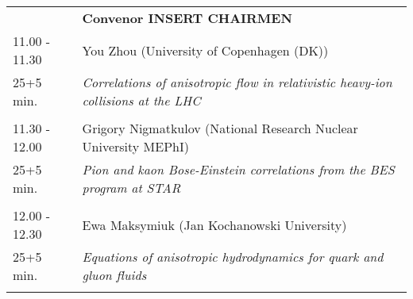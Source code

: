 \begin{longtable}{p{3cm}p{13cm}}
&\hfill {\bf Convenor INSERT CHAIRMEN }\\ 
11.00 - 11.30 & You Zhou (University of Copenhagen (DK))\\ 
25+5 min. & {\it Correlations of anisotropic flow in relativistic heavy-ion collisions at the LHC}\\ 
 & \\ 
11.30 - 12.00 & Grigory Nigmatkulov (National Research Nuclear University MEPhI)\\ 
25+5 min. & {\it Pion and kaon Bose-Einstein correlations from the BES program at STAR}\\ 
 & \\ 
12.00 - 12.30 & Ewa Maksymiuk (Jan Kochanowski University)\\ 
25+5 min. & {\it Equations of anisotropic hydrodynamics for quark and gluon fluids}\\ 
 & \\ 
\end{longtable}


